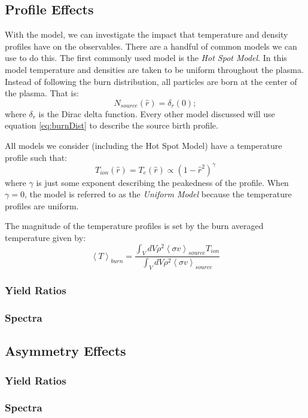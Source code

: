 \subsection{Profile Effects}

	With the model, we can investigate the impact that temperature and density profiles have on the observables. There are a handful of common models we can use to do this. The first commonly used model is the \emph{Hot Spot Model}. In this model temperature and densities are taken to be uniform throughout the plasma. Instead of following the burn distribution, all particles are born at the center of the plasma. That is:
	\begin{equation}
		N_{source}(\hat{r}) = \delta_r(0);
	\end{equation}
	where $\delta_r$ is the Dirac delta function. Every other model discussed will use equation \ref{eq:burnDist} to describe the source birth profile. 
	
	All models we consider (including the Hot Spot Model) have a temperature profile such that:
	\begin{equation}
		T_{ion}(\hat{r})=T_{e}(\hat{r}) \propto \left(1 - \hat{r}^2\right)^\gamma
	\end{equation}
	where $\gamma$ is just some exponent describing the peakedness of the profile. When $\gamma=0$, the model is referred to as the \emph{Uniform Model} because the temperature profiles are uniform. 
	
	The magnitude of the temperature profiles is set by the burn averaged temperature given by:
	\begin{equation}
		\left<T\right>_{burn} = \frac{\int_{V} dV \rho^2 \left<\sigma v\right>_{source} T_{ion}}{\int_{V} dV \rho^2 \left<\sigma v\right>_{source}}
	\end{equation}


	\subsubsection{Yield Ratios}
	
	\subsubsection{Spectra}

\subsection{Asymmetry Effects}

	\subsubsection{Yield Ratios}

	\subsubsection{Spectra}
